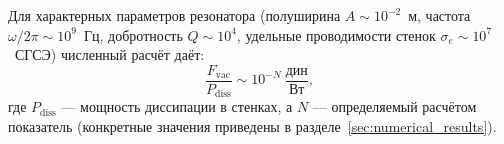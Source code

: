 \documentclass[a4paper,10pt]{article}
\newcommand{\modblock}[1]{\colorbox{modcolor!10}{\parbox{\dimexpr\linewidth-2\fboxsep}{#1}}}
\begin{document}
{Для характерных параметров резонатора (полуширина $A \sim 10^{-2}$~м, частота $\omega/2\pi \sim 10^{9}$~Гц, добротность $Q \sim 10^{4}$, удельные проводимости стенок $\sigma_{e} \sim 10^{7}$~СГСЭ) численный расчёт даёт:
\begin{equation}
\label{eq:numerical_estimate}
\frac{F_{\mathrm{vac}}}{P_{\mathrm{diss}}} \sim 10^{-N}~\frac{\text{дин}}{\text{Вт}},
\end{equation}
где $P_{\mathrm{diss}}$ --- мощность диссипации в стенках, а $N$ --- определяемый расчётом показатель (конкретные значения приведены в разделе~\ref{sec:numerical_results}).

} %
\end{document}
